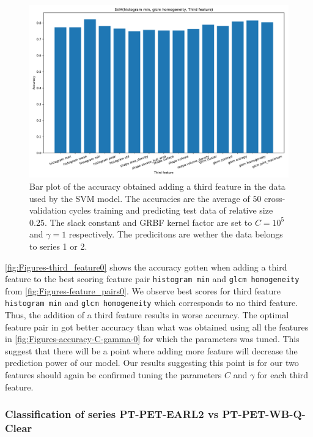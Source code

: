 \begin{figure}[H]
\centering
\includegraphics[width=1\textwidth]{Figures/third_feature0}
\caption{Bar plot of the accuracy obtained adding a third feature in the data used 
by the SVM model. The accuracies are the average 
of $50$ cross-validation cycles training and predicting test data of relative size $0.25$.
The slack constant and GRBF kernel factor are set to $C=10^5$ and $\gamma=1 $ respectively.
 The predicitons are wether the data belongs to series 1 or 2.}
\label{fig:Figures-third_feature0}
\end{figure}

\autoref{fig:Figures-third_feature0} shows the accuracy gotten when adding a third feature to the best scoring feature pair 
\verb|histogram min| and \verb|glcm homogeneity| from \autoref{fig:Figures-feature_pairs0}. We observe best scores for 
third feature \verb|histogram min| and \verb|glcm homogeneity| which corresponds to no third feature. Thus, the addition of 
a third feature results in worse accuracy. The optimal feature pair in got better accuracy than 
what was obtained using all the features in \autoref{fig:Figures-accuracy-C-gamma-0} for which the parameters was tuned.
This suggest that there will be a point where adding more feature will decrease the prediction power of our model. 
Our results suggesting this point is for our two features should again be confirmed tuning the parameters $C$ and $\gamma $ 
for each third feature.  

\subsubsection{Classification of series PT-PET-EARL2 vs PT-PET-WB-Q-Clear}

